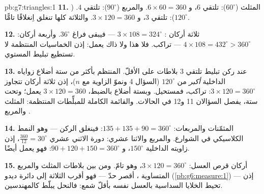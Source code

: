 \begin{solution}{pb:g7:triangles:1}
\textbf{11.} المثلث ($60^\circ$): تلتقي $6$،
و $6 \times 60 = 360$. والمربع ($90^\circ$): تلتقي $4$. 
($120^\circ$): تلتقي $3$، و $3 \times 120 = 360$. والثلاثة كلها تنغلق
اِنغلاقًا تامًّا.

\textbf{12.} ثلاثة أركان : $3 \times 108 = 324^\circ$
--- فيبقى فراغ $36^\circ$. وأربعة أركان:
$4 \times 108 = 432^\circ > 360^\circ$ --- تراكب. فلا هذا ولا ذاك
يعمل: إذن الخماسيات المنتظمة لا تستطيع تبليط المستوي.

\textbf{13.} عند ركن تبليط تلتقي $3$ بلاطات على الأقلّ. 
المنتظم بأكثر من ستة أضلاع زواياه الداخلية
\emph{أكبر} من $120^\circ$ (السؤال 4 ونموّ
الزاوية مع $n$)، إذن ثلاثة أركان تتجاوز
$3 \times 120 = 360^\circ$: تراكب، فمستحيل. وبستة أضلاع
بالضبط، $3 \times 120 = 360$ يعمل؛ وتحت ستة، يفصل السؤالان 11
و12 في الحالات. والقائمة الكاملة للمبلِّطات المنتظمة:
المثلث والمربع .

\textbf{14.} المثمّنات والمربعات:
$135 + 135 + 90 = 360^\circ$: فينغلق الركن --- وهو النمط
الكلاسيكي في الشوارع. والمربع  والاثنا عشري: دورة الاثني عشري
$\frac{360}{12} = 30^\circ$، إذن زاويته الداخلية
$150^\circ$، و $90 + 120 + 150 = 360^\circ$: فهو يعمل أيضًا.

\textbf{15.} أركان قرص العسل: $3 \times 120 = 360^\circ$،
وهو تامّ. ومن بين بلاطات المثلث والمربع  المتساوية
،  أقصر حدّ --- فهو أقرب الثلاثة
إلى دائرة ديدو
(\cref{pb:g6:measure:1}) --- إذن تحيط الخلايا السداسية
بالعسل نفسه بأقلّ شمع: فالنحل يبلّط كالمهندسين.
\end{solution}
